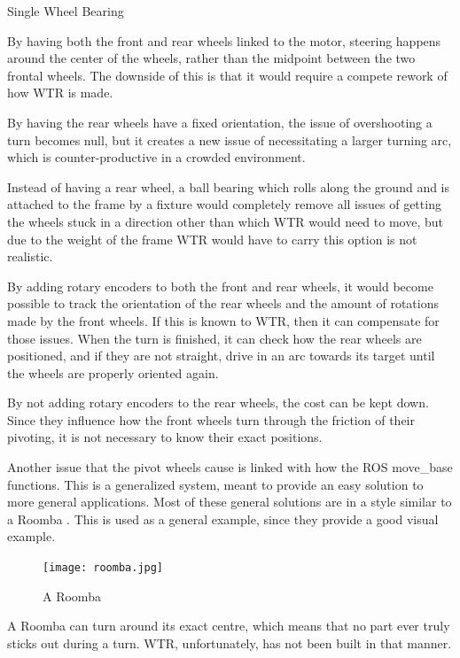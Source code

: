 \begin{labeling}{Single Wheel Bearing}
\item [Tank Controls] By having both the front and rear wheels linked to the motor, steering happens around the center of the wheels, rather than the midpoint between the two frontal wheels. The downside of this is that it would require a compete rework of how WTR is made.
\item [Fixed Rear Wheels] By having the rear wheels have a fixed orientation, the issue of overshooting a turn becomes null, but it creates a new issue of necessitating a larger turning arc, which is counter-productive in a crowded environment.
\item [Single Wheel Bearing] Instead of having a rear wheel, a ball bearing which rolls along the ground and is attached to the frame by a fixture would completely remove all issues of getting the wheels stuck in a direction other than which WTR would need to move, but due to the weight of the frame WTR would have to carry this option is not realistic.
\item [Rotary Encoders] By adding rotary encoders to both the front and rear wheels, it would become possible to track the orientation of the rear wheels and the amount of rotations made by the front wheels. If this is known to WTR, then it can compensate for those issues. When the turn is finished, it can check how the rear wheels are positioned, and if they are not straight, drive in an arc towards its target until the wheels are properly oriented again. 
\item [Front wheel encoders] By not adding rotary encoders to the rear wheels, the cost can be kept down. Since they influence how the front wheels turn through the friction of their pivoting, it is not necessary to know their exact positions.
\end{labeling}

Another issue that the pivot wheels cause is linked with how the ROS move\_base functions.
This is a generalized system, meant to provide an easy solution to more general applications.
Most of these general solutions are in a style similar to a Roomba \cite{roomba}.
This is used as a general example, since they provide a good visual example.
\begin{figure}[H]
\centering
\texttt{[image: roomba.jpg]}\
\caption{A Roomba}
\label{fig::Roomba}
\end{figure}

A Roomba can turn around its exact centre, which means that no part ever truly sticks out during a turn.
WTR, unfortunately, has not been built in that manner.

